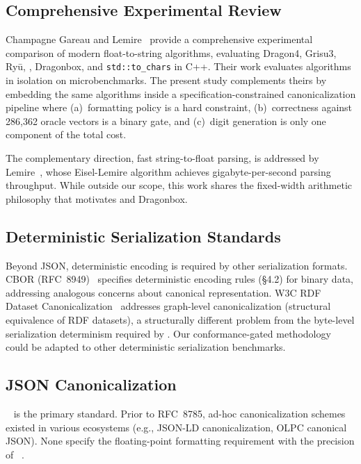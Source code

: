 \subsection{Comprehensive Experimental Review}

Champagne Gareau and Lemire~\cite{champagnegareau2026} provide a comprehensive experimental comparison of modern float-to-string
algorithms, evaluating Dragon4, Grisu3, Ry\=u, \schubfach, Dragonbox,
and \texttt{std::to\_chars} in C++.  Their work evaluates algorithms in
isolation on microbenchmarks.  The present study complements theirs by
embedding the same algorithms inside a specification-constrained
canonicalization pipeline where (a)~\ecma formatting policy is a hard
constraint, (b)~correctness against 286{,}362 oracle vectors is a
binary gate, and (c)~digit generation is only one component of the
total cost.

The complementary direction, fast string-to-float parsing, is addressed
by Lemire~\cite{lemire2021number}, whose Eisel-Lemire algorithm achieves
gigabyte-per-second parsing throughput.  While outside our scope, this
work shares the fixed-width arithmetic philosophy that motivates
\schubfach and Dragonbox.

\subsection{Deterministic Serialization Standards}

Beyond JSON, deterministic encoding is required by other serialization
formats.  CBOR (RFC~8949)~\cite{rfc8949} specifies deterministic encoding
rules (\S4.2) for binary data, addressing analogous concerns about
canonical representation.  W3C RDF Dataset
Canonicalization~\cite{w3c2024rdf} addresses graph-level canonicalization
(structural equivalence of RDF datasets), a structurally different
problem from the byte-level serialization determinism required by
\rfcjcs.  Our conformance-gated methodology could be adapted to other
deterministic serialization benchmarks.

\subsection{JSON Canonicalization}

\rfcjcs~\cite{rfc8785} is the primary standard.  Prior to RFC~8785,
ad-hoc canonicalization schemes existed in various ecosystems (e.g.,
JSON-LD canonicalization, OLPC canonical JSON).  None specify the
floating-point formatting requirement with the precision of
\ecma~\cite{ecma262}.

